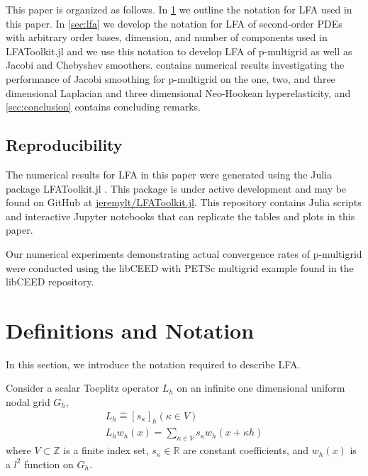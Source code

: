 \documentclass[review]{siamart190516}
\begin{document}
This paper is organized as follows.
In \cref{sec:notation} we outline the notation for LFA used in this paper.
In \cref{sec:lfa} we develop the notation for LFA of second-order PDEs with arbitrary order bases, dimension, and number of components used in LFAToolkit.jl and we use this notation to develop LFA of p-multigrid as well as Jacobi and Chebyshev smoothers.
 contains numerical results investigating the performance of Jacobi smoothing for p-multigrid on the one, two, and three dimensional Laplacian and three dimensional Neo-Hookean hyperelasticity, and \cref{sec:conclusion} contains concluding remarks.

\subsection{Reproducibility}\label{sec:reproducibility}

The numerical results for LFA in this paper were generated using the Julia package LFAToolkit.jl \cite{thompson2021toolkit}.
This package is under active development and may be found on GitHub at \href{https://github.com/jeremylt/LFAToolkit.jl}{jeremylt/LFAToolkit.jl}.
This repository contains Julia scripts and interactive Jupyter notebooks that can replicate the tables and plots in this paper.

Our numerical experiments demonstrating actual convergence rates of p-multigrid were conducted using the libCEED \cite{libceed-user-manual} with PETSc \cite{petsc-user-ref} multigrid example found in the libCEED repository.

\section{Definitions and Notation}\label{sec:notation}

In this section, we introduce the notation required to describe LFA.

Consider a scalar Toeplitz operator $L_h$ on an infinite one dimensional uniform nodal grid $G_h$,
\begin{equation}
\begin{split}
L_h \mathrel{\hat{=}} \left[ s_\kappa \right]_h \left( \kappa \in V \right)\\
L_h w_h \left( x \right) = \sum_{\kappa \in V} s_\kappa w_h \left( x + \kappa h \right)
\end{split}
\end{equation}
where $V \subset \mathbb{Z}$ is a finite index set, $s_\kappa \in \mathbb{R}$ are constant coefficients, and $w_h \left( x \right)$ is a $l^2$ function on $G_h$.
\end{document}
